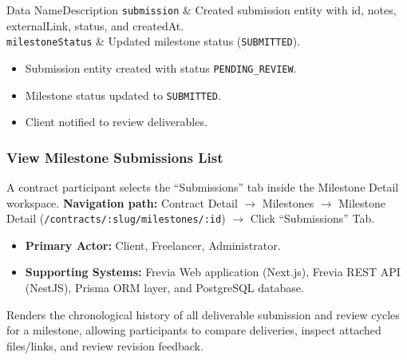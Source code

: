 \begin{specdatatable}{Data Name}{Description}
      \texttt{submission} & Created submission entity with id, notes, externalLink, status, and createdAt.\\ \hline
      \texttt{milestoneStatus} & Updated milestone status (\texttt{SUBMITTED}).\\ \hline
\end{specdatatable}

\begin{itemize}[leftmargin=1.6em,topsep=3pt,itemsep=2pt,parsep=0pt,label=$\bullet$]
      \item Submission entity created with status \texttt{PENDING\_REVIEW}.
      \item Milestone status updated to \texttt{SUBMITTED}.
      \item Client notified to review deliverables.
\end{itemize}

\subsubsection{ View Milestone Submissions List}

A contract participant selects the ``Submissions'' tab inside the Milestone Detail workspace.\newline
\textbf{Navigation path:} Contract Detail $\rightarrow$ Milestones $\rightarrow$ Milestone Detail (\texttt{/contracts/:slug/milestones/:id}) $\rightarrow$ Click ``Submissions'' Tab.


\begin{itemize}[leftmargin=1.6em,topsep=3pt,itemsep=2pt,parsep=0pt,label=$\bullet$]
      \item \textbf{Primary Actor:} Client, Freelancer, Administrator.
      \item \textbf{Supporting Systems:} Frevia Web application (Next.js), Frevia REST API (NestJS), Prisma ORM layer, and PostgreSQL database.
\end{itemize}

\noindent Renders the chronological history of all deliverable submission and review cycles for a milestone, allowing participants to compare deliveries, inspect attached files/links, and review revision feedback.

